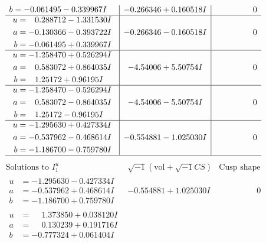 \documentclass[1p]{elsarticle_modified}
\theoremstyle{definition}
\newcommand{\I}{\sqrt{-1}}
\begin{document}
$$\begin{array}{c|c|c}
\begin{aligned}
b &= -0.061495 - 0.339967 I\end{aligned}
 & -0.266346 + 0.160518 I & \phantom{-0.000000 } 0 \\ \hline\begin{aligned}
u &= \phantom{-}0.288712 - 1.331530 I \\
a &= -0.130366 - 0.393722 I \\
b &= -0.061495 + 0.339967 I\end{aligned}
 & -0.266346 - 0.160518 I & \phantom{-0.000000 } 0 \\ \hline\begin{aligned}
u &= -1.258470 + 0.526294 I \\
a &= \phantom{-}0.583072 + 0.864035 I \\
b &= \phantom{-}1.25172 + 0.96195 I\end{aligned}
 & -4.54006 + 5.50754 I & \phantom{-0.000000 } 0 \\ \hline\begin{aligned}
u &= -1.258470 - 0.526294 I \\
a &= \phantom{-}0.583072 - 0.864035 I \\
b &= \phantom{-}1.25172 - 0.96195 I\end{aligned}
 & -4.54006 - 5.50754 I & \phantom{-0.000000 } 0 \\ \hline\begin{aligned}
u &= -1.295630 + 0.427334 I \\
a &= -0.537962 - 0.468614 I \\
b &= -1.186700 - 0.759780 I\end{aligned}
 & -0.554881 - 1.025030 I & \phantom{-0.000000 } 0\\
 \hline 
 \end{array}$$\newpage$$\begin{array}{c|c|c}  
\text{Solutions to }I^u_{1}& \I (\text{vol} + \sqrt{-1}CS) & \text{Cusp shape}\\
 \hline 
\begin{aligned}
u &= -1.295630 - 0.427334 I \\
a &= -0.537962 + 0.468614 I \\
b &= -1.186700 + 0.759780 I\end{aligned}
 & -0.554881 + 1.025030 I & \phantom{-0.000000 } 0 \\ \hline\begin{aligned}
u &= \phantom{-}1.373850 + 0.038120 I \\
a &= \phantom{-}0.130239 + 0.191716 I \\
b &= -0.777324 + 0.061404 I\end{aligned}

\end{array}$$
\end{document}
